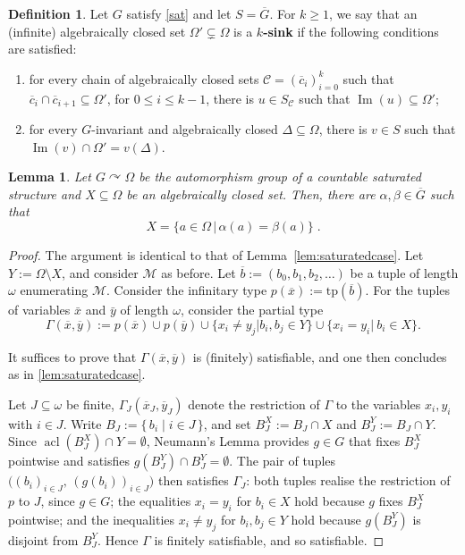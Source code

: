 \documentclass{article}
\newtheorem{lemma}[theorem]{Lemma}
\theoremstyle{remark}
\theoremstyle{definition}
\newtheorem{definition}[theorem]{Definition}
\def\acts{\curvearrowright}
\DeclareMathOperator{\acl}{acl}
\newcommand{\M}[0]{\mathcal{M}}
\newcommand{\nn}[0]{S}%
\DeclareMathOperator{\im}{Im}
\newcommand{\C}[0]{\mathcal{C}}
\renewcommand\leq{\leqslant}
\renewcommand\geq{\geqslant}
\begin{document}
{{{{{  
  \begin{definition}\label{sinks}
  Let $G$ satisfy \ref{sat} and let $S=\overline{G}$. For $k\geq 1$, we say that an (infinite) algebraically closed set $\Omega'\subsetneq \Omega$ is a $k$\textbf{-sink}  if the following conditions are satisfied:
  \begin{enumerate}
  		\item \label{sink3}  for every chain of algebraically closed sets $\C=(\overline{c}_{i})_{i=0}^{k}$ such that {$\overline{c}_{i}\cap \overline{c}_{i+1}\subseteq\Omega'$},
        for %
         $0\leq i\leq k-1$, there is $u\in\nn_{\C}$ such that $\im(u)\subseteq \Omega'$;
  		\item \label{sink4} for every $G$-invariant and algebraically closed $\Delta\subseteq\Omega$, there is $v\in S$ such that $\im(v)\cap \Omega'=v(\Delta)$.
  	\end{enumerate}
  \end{definition}


\begin{lemma}\label{lem:forsink1}  %
	Let $G\acts\Omega$ be the automorphism group of a countable saturated structure and $X\subseteq\Omega$ be an algebraically closed set. Then, there are $\alpha, \beta\in\overline{G}$ such that%
    \begin{equation}\label{eq:sink2}
       {X=\{a\in\Omega\,|\,\alpha(a)= \beta(a)\}}\;. %
    \end{equation}
    
\end{lemma}
\begin{proof}
The argument is identical to that of Lemma~\ref{lem:saturatedcase}. 
Let $Y:=\Omega\setminus X$, and consider $\M$ as before. Let $\overline{b}:=(b_0, b_1, b_2, \dots)$ be a tuple of length $\omega$ enumerating $\M$. Consider the infinitary type $p(\overline{x}):=\mathrm{tp}(\overline{b})$. For the tuples of variables $\bar x$ and $\bar y$ of length $\omega$, consider the partial type 
\[\Gamma(\overline{x}, \overline{y}):=p(\overline{x})\cup p(\overline{y}) \cup\{x_{i}\neq y_{j}\vert b_i,b_{j}\in Y\}\cup\{x_i=y_i\vert\  b_i\in X\}.\]

It suffices to prove that $\Gamma(\overline{x}, \overline{y})$ is (finitely) satisfiable, and one then concludes as in \cref{lem:saturatedcase}. 

Let $J\subseteq\omega$ be finite,  $\Gamma_J(\overline{x}_J, \overline{y}_J)$  denote the restriction of $\Gamma$
to the variables $x_i, y_i$ with $i \in J$. Write
$B_J := \{\, b_i \mid i \in J \,\}$, and set $B_J^X := B_J \cap X$ and
$B_J^Y := B_J \cap Y$. Since $\acl(B_J^X) \cap Y = \emptyset$, Neumann's
Lemma provides $g \in G$ that fixes $B_J^X$ pointwise and satisfies
$g(B_J^Y) \cap B_J^Y = \emptyset$. The pair of tuples
$\bigl( (b_i)_{i \in J},\, (g(b_i))_{i \in J} \bigr)$ then satisfies
$\Gamma_J$: both tuples realise the restriction of $p$ to $J$, since
$g \in G$; the equalities $x_i = y_i$ for $b_i \in X$ hold because $g$ fixes
$B_J^X$ pointwise; and the inequalities $x_i \neq y_j$ for $b_i, b_j \in Y$
hold because $g(B_J^Y)$ is disjoint from $B_J^Y$. Hence $\Gamma$ is finitely
satisfiable, and so satisfiable.
\end{proof} 

}}}}}
\end{document}
